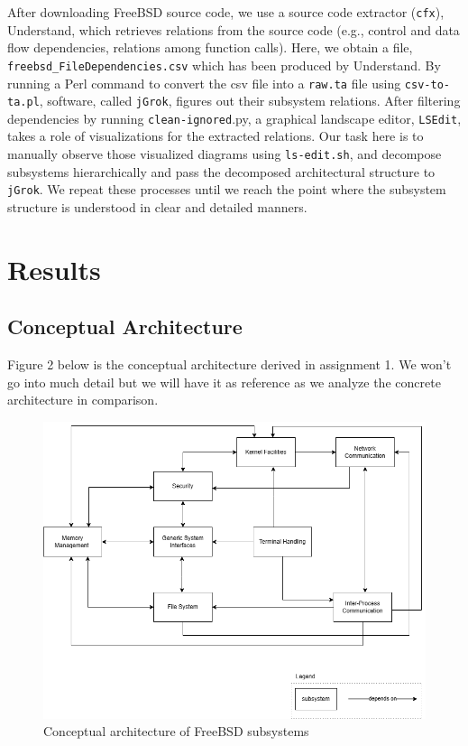 \documentclass[12pt, dvipsnames, a4paper]{article}
\newcommand{\code}[1]{\texttt{#1}}
\begin{document}
After downloading FreeBSD source code, we use a source code extractor (\code{cfx}), Understand, which retrieves relations from the source code (e.g., control and data flow dependencies, relations among function calls). Here, we obtain a file, \code{freebsd\_FileDependencies.csv} which has been produced by Understand. By running a Perl command to convert the csv file into a \code{raw.ta} file using \code{csv-to-ta.pl}, software, called \code{jGrok}, figures out their subsystem relations. After filtering dependencies by running \code{clean-ignored}.py, a graphical landscape editor, \code{LSEdit}, takes a role of visualizations for the extracted relations. Our task here is to manually observe those visualized diagrams using \code{ls-edit.sh}, and decompose subsystems hierarchically and pass the decomposed architectural structure to \code{jGrok}. We repeat these processes until we reach the point where the subsystem structure is understood in clear and detailed manners.
\clearpage
\section{Results}
\subsection{Conceptual Architecture}
Figure 2 below is the conceptual architecture derived in assignment 1. We won't go into much detail but we will have it as reference as we analyze the concrete architecture in comparison.

\begin{figure}[!htb]
	\center
	\includegraphics[width = 390pt]{assets/conceptual-architecture.png}
	\caption{Conceptual architecture of FreeBSD subsystems}
\end{figure}
\end{document}

